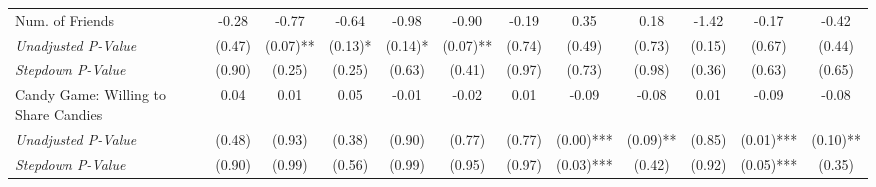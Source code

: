 \begin{tabular}{l c c c c c c c c c c c}
Num. of Friends & -0.28 & -0.77 & -0.64 & -0.98 & -0.90 & -0.19 & 0.35 & 0.18 & -1.42 & -0.17 & -0.42 \\
\quad \textit{Unadjusted P-Value} & (0.47) & (0.07)** & (0.13)* & (0.14)* & (0.07)** & (0.74) & (0.49) & (0.73) & (0.15) & (0.67) & (0.44) \\
\quad \textit{Stepdown P-Value} & (0.90) & (0.25) & (0.25) & (0.63) & (0.41) & (0.97) & (0.73) & (0.98) & (0.36) & (0.63) & (0.65) \\
Candy Game: Willing to Share Candies & 0.04 & 0.01 & 0.05 & -0.01 & -0.02 & 0.01 & -0.09 & -0.08 & 0.01 & -0.09 & -0.08 \\
\quad \textit{Unadjusted P-Value} & (0.48) & (0.93) & (0.38) & (0.90) & (0.77) & (0.77) & (0.00)*** & (0.09)** & (0.85) & (0.01)*** & (0.10)** \\
\quad \textit{Stepdown P-Value} & (0.90) & (0.99) & (0.56) & (0.99) & (0.95) & (0.97) & (0.03)*** & (0.42) & (0.92) & (0.05)*** & (0.35) \\
\bottomrule
\end{tabular}
